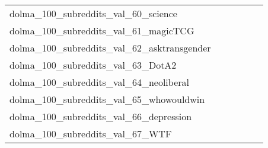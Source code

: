{\begin{longtable}{m{6cm}m{1.7cm}m{1.7cm}m{1.7cm}m{1.7cm}m{1.7cm}}
	dolma\_100\_subreddits\_val\_60\_science  & \colorbox[HTML]{ffffe5}{\makebox[\mywidth][c]{20.44}} & \colorbox[HTML]{b3df91}{\makebox[\mywidth][c]{19.46}} & \colorbox[HTML]{ffffe5}{\makebox[\mywidth][c]{20.64}} & \colorbox[HTML]{c9e99b}{\makebox[\mywidth][c]{19.51}} & \colorbox[HTML]{77c578}{\makebox[\mywidth][c]{19.38}}\\
	dolma\_100\_subreddits\_val\_61\_magicTCG  & \colorbox[HTML]{ffffe5}{\makebox[\mywidth][c]{28.82}} & \colorbox[HTML]{e3f4aa}{\makebox[\mywidth][c]{26.79}} & \colorbox[HTML]{ffffe5}{\makebox[\mywidth][c]{28.94}} & \colorbox[HTML]{d5eea1}{\makebox[\mywidth][c]{26.69}} & \colorbox[HTML]{77c578}{\makebox[\mywidth][c]{26.38}}\\
	dolma\_100\_subreddits\_val\_62\_asktransgender  & \colorbox[HTML]{ffffe5}{\makebox[\mywidth][c]{20.72}} & \colorbox[HTML]{e5f4ab}{\makebox[\mywidth][c]{19.86}} & \colorbox[HTML]{ffffe5}{\makebox[\mywidth][c]{21.07}} & \colorbox[HTML]{def2a6}{\makebox[\mywidth][c]{19.83}} & \colorbox[HTML]{77c578}{\makebox[\mywidth][c]{19.62}}\\
	dolma\_100\_subreddits\_val\_63\_DotA2  & \colorbox[HTML]{ffffe5}{\makebox[\mywidth][c]{34.35}} & \colorbox[HTML]{bee496}{\makebox[\mywidth][c]{32.38}} & \colorbox[HTML]{ffffe5}{\makebox[\mywidth][c]{34.74}} & \colorbox[HTML]{e2f3a9}{\makebox[\mywidth][c]{32.57}} & \colorbox[HTML]{77c578}{\makebox[\mywidth][c]{32.16}}\\
	dolma\_100\_subreddits\_val\_64\_neoliberal  & \colorbox[HTML]{ffffe5}{\makebox[\mywidth][c]{21.74}} & \colorbox[HTML]{bae294}{\makebox[\mywidth][c]{20.59}} & \colorbox[HTML]{ffffe5}{\makebox[\mywidth][c]{22.26}} & \colorbox[HTML]{ccea9c}{\makebox[\mywidth][c]{20.64}} & \colorbox[HTML]{77c578}{\makebox[\mywidth][c]{20.45}}\\
	dolma\_100\_subreddits\_val\_65\_whowouldwin  & \colorbox[HTML]{ffffe5}{\makebox[\mywidth][c]{29.18}} & \colorbox[HTML]{e8f6ae}{\makebox[\mywidth][c]{27.81}} & \colorbox[HTML]{ffffe5}{\makebox[\mywidth][c]{30.08}} & \colorbox[HTML]{d3eda0}{\makebox[\mywidth][c]{27.63}} & \colorbox[HTML]{77c578}{\makebox[\mywidth][c]{27.30}}\\
	dolma\_100\_subreddits\_val\_66\_depression  & \colorbox[HTML]{ffffe5}{\makebox[\mywidth][c]{18.28}} & \colorbox[HTML]{d7efa2}{\makebox[\mywidth][c]{17.52}} & \colorbox[HTML]{ffffe5}{\makebox[\mywidth][c]{18.31}} & \colorbox[HTML]{c9e99b}{\makebox[\mywidth][c]{17.50}} & \colorbox[HTML]{77c578}{\makebox[\mywidth][c]{17.41}}\\
	dolma\_100\_subreddits\_val\_67\_WTF  & \colorbox[HTML]{ffffe5}{\makebox[\mywidth][c]{22.30}} & \colorbox[HTML]{dcf1a5}{\makebox[\mywidth][c]{21.18}} & \colorbox[HTML]{ffffe5}{\makebox[\mywidth][c]{22.38}} & \colorbox[HTML]{d8efa2}{\makebox[\mywidth][c]{21.17}} & \colorbox[HTML]{77c578}{\makebox[\mywidth][c]{20.99}}\\

\end{longtable}}

